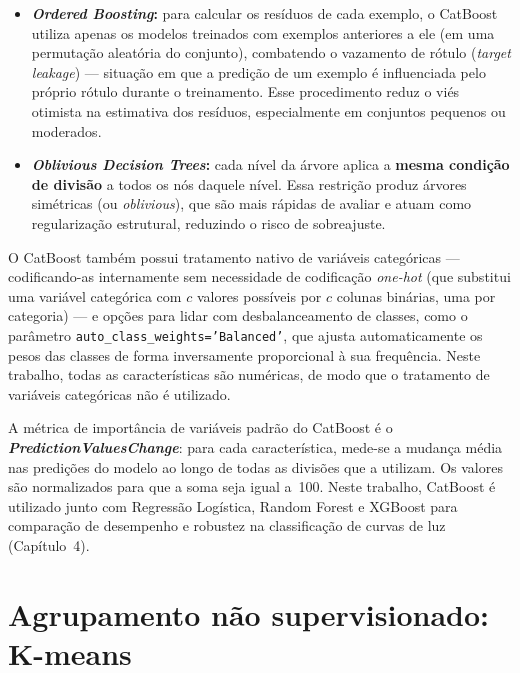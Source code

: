\begin{itemize}
	\item \textbf{\textit{Ordered Boosting}:} para calcular os resíduos de cada exemplo, o CatBoost utiliza apenas os modelos treinados com exemplos anteriores a ele (em uma permutação aleatória do conjunto), combatendo o vazamento de rótulo (\textit{target leakage}) --- situação em que a predição de um exemplo é influenciada pelo próprio rótulo durante o treinamento. Esse procedimento reduz o viés otimista na estimativa dos resíduos, especialmente em conjuntos pequenos ou moderados.

	\item \textbf{\textit{Oblivious Decision Trees}:} cada nível da árvore aplica a \textbf{mesma condição de divisão} a todos os nós daquele nível. Essa restrição produz árvores simétricas (ou \textit{oblivious}), que são mais rápidas de avaliar e atuam como regularização estrutural, reduzindo o risco de sobreajuste.
\end{itemize}

O CatBoost também possui tratamento nativo de variáveis categóricas --- codificando-as internamente sem necessidade de codificação \textit{one-hot} (que substitui uma variável categórica com $c$ valores possíveis por $c$ colunas binárias, uma por categoria) --- e opções para lidar com desbalanceamento de classes, como o parâmetro \texttt{auto\_class\_weights='Balanced'}, que ajusta automaticamente os pesos das classes de forma inversamente proporcional à sua frequência. Neste trabalho, todas as características são numéricas, de modo que o tratamento de variáveis categóricas não é utilizado.

A métrica de importância de variáveis padrão do CatBoost é o \textbf{\textit{PredictionValuesChange}}: para cada característica, mede-se a mudança média nas predições do modelo ao longo de todas as divisões que a utilizam. Os valores são normalizados para que a soma seja igual a~100. Neste trabalho, CatBoost é utilizado junto com Regressão Logística, Random Forest e XGBoost para comparação de desempenho e robustez na classificação de curvas de luz (Capítulo~4).

\section{Agrupamento não supervisionado: K-means}
\label{sec:kmeans}

